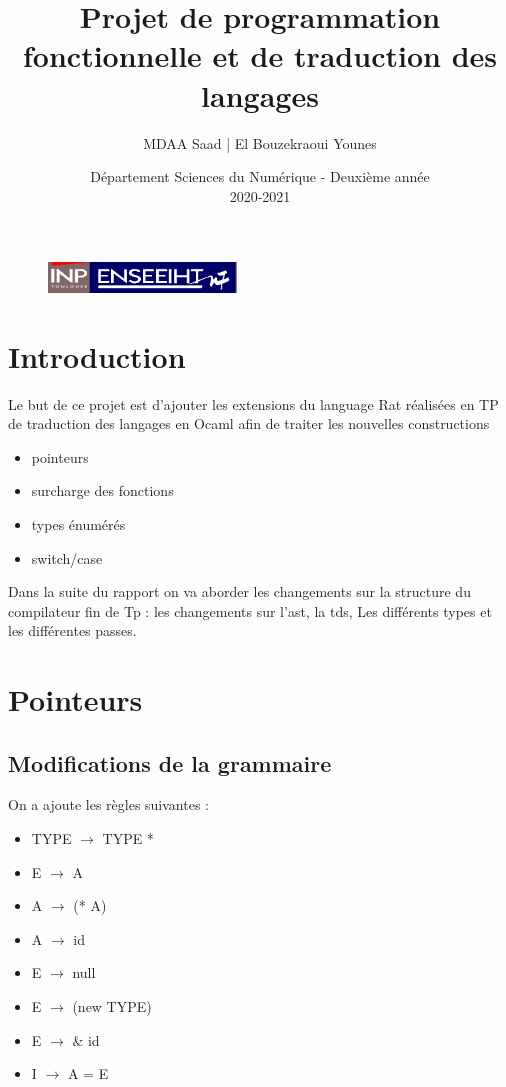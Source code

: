 \documentclass{article}
\begin{document}
\begin{figure}[t]
\centering
\includegraphics[width=5cm]{inp_n7.png}
\end{figure}

\title{\vspace{4cm} \textbf{Projet de programmation fonctionnelle et de traduction des langages}}
\author{MDAA Saad | El Bouzekraoui Younes}
\date{\vspace{7cm} Département Sciences du Numérique - Deuxième année \\
2020-2021 }

\maketitle

\newpage
\tableofcontents

\newpage
\section{Introduction}
Le but de ce projet est d'ajouter les extensions du language Rat  réalisées en TP de traduction des langages en Ocaml afin de traiter les nouvelles constructions
\begin{itemize}
    \item pointeurs
    \item surcharge des fonctions
    \item types énumérés
    \item switch/case
\end{itemize}
Dans la suite du rapport on va aborder les changements sur la structure du compilateur fin de Tp : les changements sur l'ast, la tds, Les différents types
 et les différentes passes.
\section{Pointeurs}
\subsection{Modifications de la grammaire}
On a ajoute les règles suivantes :
\begin{itemize}
    \item TYPE $\rightarrow$ TYPE *
    \item E $\rightarrow$ A
    \item A $\rightarrow$ (* A)
    \item A $\rightarrow$ id
    \item E $\rightarrow$ null
    \item E $\rightarrow$ (new TYPE)
    \item E $\rightarrow$ \& id
    \item I $\rightarrow$ A = E
\end{itemize}
\end{document}

